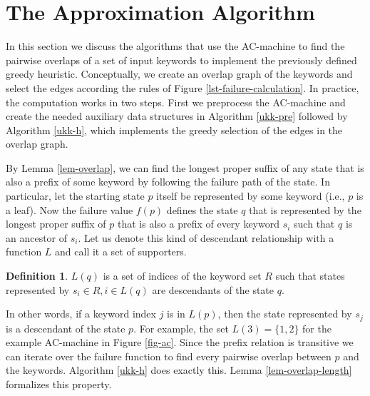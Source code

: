 \documentclass[english,twoside,censored,csm,algorithms-track-2020]{HYthesisML}
\theoremstyle{plain}
\theoremstyle{definition}
\newtheorem{definition}[theorem]{Definition}
\numberwithin{testexample}{chapter}
\begin{document}
\section{The Approximation Algorithm}

In this section we discuss the algorithms that use the AC-machine to find the pairwise overlaps
of a set of input keywords to implement the previously defined greedy heuristic. Conceptually,
we create an overlap graph of the keywords and select the edges according the rules of
Figure \ref{lst-failure-calculation}. In practice, the computation works in two steps. First we
preprocess the AC-machine and create the needed auxiliary data structures in Algorithm \ref{ukk-pre}
followed by Algorithm \ref{ukk-h}, which implements the greedy selection of the edges in the
overlap graph.

By Lemma \ref{lem-overlap}, we can find the longest proper suffix of any state that is also
a prefix of some keyword by following the failure path of the state. In particular, let the starting
state $p$ itself be represented by some keyword (i.e., $p$ is a leaf). Now the failure value $f(p)$
defines the state $q$ that is represented by the longest proper suffix of $p$ that is also a prefix
of every keyword $s_i$ such that $q$ is an ancestor of $s_i$.
Let us denote this kind of descendant relationship with a function $L$ and call it a set of
supporters.

\begin{definition}
$L(q)$ is a set of indices of the keyword set $R$ such that states represented by
$s_i\in R, i\in L(q)$ are descendants of the state $q$.
\end{definition}

In other words, if a keyword index
$j$ is in $L(p)$, then the state represented by $s_j$ is a descendant of the state $p$.
For example, the set $L(3) = \{1,2\}$ for the example AC-machine in Figure \ref{fig-ac}.
Since the prefix relation is transitive we can iterate over the failure function to find every
pairwise overlap between $p$ and the keywords. Algorithm \ref{ukk-h} does exactly this.
Lemma \ref{lem-overlap-length} formalizes this property.


\end{document}
